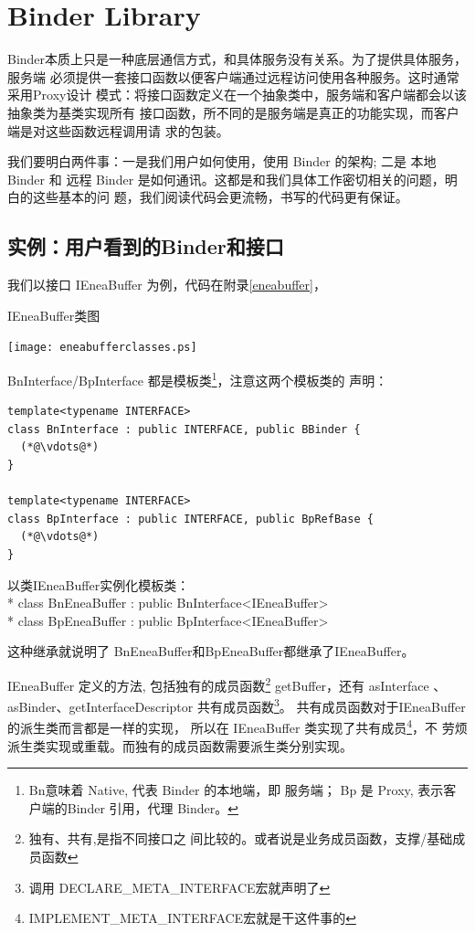 \documentclass[a4paper,11pt]{article}
\begin{document}
\section{Binder Library}
Binder本质上只是一种底层通信方式，和具体服务没有关系。为了提供具体服务，服务端
必须提供一套接口函数以便客户端通过远程访问使用各种服务。这时通常采用Proxy设计
模式：将接口函数定义在一个抽象类中，服务端和客户端都会以该抽象类为基类实现所有
接口函数，所不同的是服务端是真正的功能实现，而客户端是对这些函数远程调用请
求的包装。

我们要明白两件事：一是我们用户如何使用，使用 Binder 的架构; 二是 本地Binder 和
远程 Binder 是如何通讯。这都是和我们具体工作密切相关的问题，明白的这些基本的问
题，我们阅读代码会更流畅，书写的代码更有保证。

\subsection{实例：用户看到的Binder和接口}

我们以接口 IEneaBuffer 为例，代码在附录\autoref{eneabuffer}，

\caption{IEneaBuffer类图}
\texttt{[image: eneabufferclasses.ps]}

BnInterface/BpInterface 都是模板类\footnote{Bn意味着 Native, 代表 Binder 的本地端，即
服务端； Bp 是 Proxy, 表示客户端的Binder 引用，代理 Binder。}，注意这两个模板类的
声明：
\begin{lstlisting}
template<typename INTERFACE>
class BnInterface : public INTERFACE, public BBinder {
  (*@\vdots@*)
}

template<typename INTERFACE>
class BpInterface : public INTERFACE, public BpRefBase {
  (*@\vdots@*)
}
\end{lstlisting}

以类IEneaBuffer实例化模板类：\\*
class BnEneaBuffer : public BnInterface<IEneaBuffer> \\*
class BpEneaBuffer : public BpInterface<IEneaBuffer> 

这种继承就说明了 BnEneaBuffer和BpEneaBuffer都继承了IEneaBuffer。

IEneaBuffer 定义的方法, 包括独有的成员函数\footnote{独有、共有,是指不同接口之
间比较的。或者说是业务成员函数，支撑/基础成员函数} getBuffer，还有 asInterface
、asBinder、getInterfaceDescriptor 共有成员函数\footnote{调用
DECLARE_META_INTERFACE宏就声明了}。
共有成员函数对于IEneaBuffer的派生类而言都是一样的实现，
所以在 IEneaBuffer 类实现了共有成员\footnote{IMPLEMENT_META_INTERFACE宏就是干这件事的}，不
劳烦派生类实现或重载。而独有的成员函数需要派生类分别实现。
\end{document}

